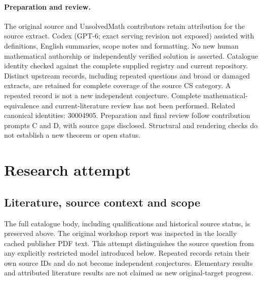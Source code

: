 \documentclass[11pt]{article}
\begin{document}
\paragraph{Preparation and review.}
The original source and UnsolvedMath contributors retain attribution for the source extract. Codex (GPT-6; exact serving revision not exposed) assisted with definitions, English summaries, scope notes and formatting. No new human mathematical authorship or independently verified solution is asserted. Catalogue identity checked against the complete supplied registry and current repository. Distinct upstream records, including repeated questions and broad or damaged extracts, are retained for complete coverage of the source CS category. A repeated record is not a new independent conjecture. Complete mathematical-equivalence and current-literature review has not been performed. Related canonical identities: 30004905. Preparation and final review follow contribution prompts C and D, with source gaps disclosed. Structural and rendering checks do not establish a new theorem or open status.
\label{end:statement}

\section{Research attempt}
\subsection{Literature, source context and scope}
The full catalogue body, including qualifications and historical source status, is preserved above. The original workshop report was inspected in the locally cached publisher PDF text. This attempt distinguishes the source question from any explicitly restricted model introduced below. Repeated records retain their own source IDs and do not become independent conjectures. Elementary results and attributed literature results are not claimed as new original-target progress.
\end{document}
